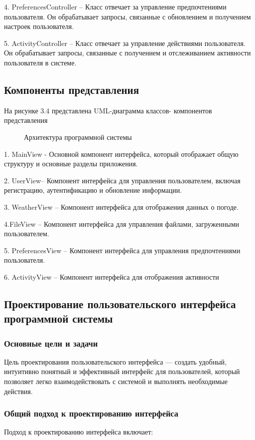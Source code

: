 4. PreferencesController – Класс отвечает за управление предпочтениями пользователя. Он обрабатывает запросы, связанные с обновлением и получением настроек пользователя.

5. ActivityController – Класс отвечает за управление действиями пользователя. Он обрабатывает запросы, связанные с получением и отслеживанием активности пользователя в системе. 

\subsection{Компоненты представления}

На рисунке 3.4 представлена UML-диаграмма классов- компонентов представления
\begin{figure}
	\center{\texttt{[image: un7]}}
	\caption{Архитектура программной системы}
	\label{un7:image}
\end{figure}

1. MainView - Основной компонент интерфейса, который отображает общую структуру и основные разделы приложения.

2. UserView– Компонент интерфейса для управления пользователем, включая регистрацию, аутентификацию и обновление информации.

3. WeatherView – Компонент интерфейса для отображения данных о погоде. 

4.FileView – Компонент интерфейса для управления файлами, загруженными пользователем.

5. PreferencesView – Компонент интерфейса для управления предпочтениями пользователя.

6. ActivityView – Компонент интерфейса для отображения активности 
\subsection{Проектирование пользовательского интерфейса программной системы}
\subsubsection{Основные цели и задачи}
Цель проектирования пользовательского интерфейса — создать удобный, интуитивно понятный и эффективный интерфейс для пользователей, который позволяет легко взаимодействовать с системой и выполнять необходимые действия.
\subsubsection{Общий подход к проектированию интерфейса}
Подход к проектированию интерфейса включает:

